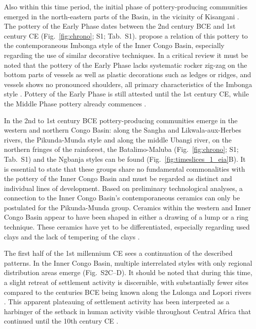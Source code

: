 \documentclass[smallextended,natbib]{svjour3}       %
\begin{document}
Also within this time period, the initial phase of pottery-producing communities emerged in the north-eastern parts of the Basin, in the vicinity of Kisangani \citep[Fig.~S2A;][]{LivingstoneSmith.2017}. The pottery of the Early Phase dates between the 2nd century BCE and 1st century CE (Fig.~\ref{fig:chrono}; S1; Tab.~S1). \citet[110,115]{LivingstoneSmith.2017} propose a relation of this pottery to the contemporaneous Imbonga style of the Inner Congo Basin, especially regarding the use of similar decorative techniques. In a critical review it must be noted that the pottery of the Early Phase \citep[112 Fig.~24]{LivingstoneSmith.2017} lacks systematic rocker zig-zag on the bottom parts of vessels as well as plastic decorations such as ledges or ridges, and vessels shows no pronounced shoulders, all primary characteristics of the Imbonga style \citep[170 Fig.~84.1--20]{Seidensticker.2021e}. Pottery of the Early Phase is still attested until the 1st century CE, while the Middle Phase pottery already commences \citep[Fig.~\ref{fig:chrono}; S1; Tab.~S1;][]{LivingstoneSmith.2017}.

In the 2nd to 1st century BCE pottery-producing communities emerge in the western and northern Congo Basin: along the Sangha and Likwala-aux-Herbes rivers, the Pikunda-Munda style and along the middle Ubangi river, on the northern fringes of the rainforest, the Batalimo-Maluba (Fig.~\ref{fig:chrono}; S1; Tab.~S1) and the Ngbanja styles can be found (Fig.~\ref{fig:timeslices_1_eia}B). It is essential to state that these groups share no fundamental commonalities with the pottery of the Inner Congo Basin and must be regarded as distinct and individual lines of development. Based on preliminary technological analyses, a connection to the Inner Congo Basin's contemporaneous ceramics can only be postulated for the Pikunda-Munda group. Ceramics within the western and Inner Congo Basin appear to have been shaped in either a drawing of a lump or a ring technique. These ceramics have yet to be differentiated, especially regarding used clays and the lack of tempering of the clays \citep{Seidensticker.2020}. 

The first half of the 1st millennium CE sees a continuation of the described patterns. In the Inner Congo Basin, multiple interrelated styles with only regional distribution areas emerge (Fig.~S2C--D). It should be noted that during this time, a slight retreat of settlement activity is discernible, with substantially fewer sites compared to the centuries BCE being known along the Lulonga and Lopori rivers \citep[224]{Seidensticker.2021e}. This apparent plateauing of settlement activity has been interpreted as a harbinger of the setback in human activity visible throughout Central Africa that continued until the 10th century CE \citep{Seidensticker.2021}.
\end{document}
